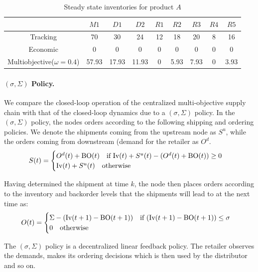 \begin{table}[h]
\caption{Steady state  inventories for product $A$}
\label{tab:esc:steady}
\begin{center}
\begin{tabular}{ccccccccc}\toprule
& $M1$ & $D1$ & $D2$  & $R1$ & $R2$ & $R3$ & $R4$ & $R5$ \\
\midrule
Tracking                      &70   &30   &24   &12&18  &20  &8&16 \\
Economic                      &0    &0    &0    &0 &0   &0   &0&0   \\
Multiobjective($\omega = 0.4$)&57.93&17.93&11.93&0 &5.93&7.93&0&3.93\\
\bottomrule
\end{tabular}
\end{center}
\end{table}

\paragraph{$(\sigma,\Sigma) $ Policy.} We compare the closed-loop operation of
the centralized multi-objective supply chain with that of the
closed-loop dynamics due to a $(\sigma,\Sigma) $ policy. In the $(\sigma,\Sigma) $
policy, the nodes orders according to the
following shipping and ordering policies. We denote the shipments coming from the upstream
node as $S^{u}$, while the orders coming from downstream (demand for
the retailer as $O^{d}$.
\begin{equation}
S(t) = \begin{cases} O^{d}(t)+\textrm{BO}(t) \quad \text{if~}
  \textrm{Iv}(t)+S^{u}(t)-(O^{d}(t)+\textrm{BO}(t)) \geq 0 \\
  \textrm{Iv}(t)+S^{u}(t)\quad \text{otherwise}
  \end{cases}
\end{equation}

Having determined the shipment at time $k$, the node then places
orders according to the inventory and backorder levels that the
shipments will lead to at the next time as:
\begin{equation}
O(t) = \begin{cases} \Sigma - (\textrm{Iv}(t+1)-\textrm{BO}(t+1)) \quad
  \text{if~} (\textrm{Iv}(t+1)-\textrm{BO}(t+1)) \leq \sigma\\
0 \quad \text{otherwise~}
\end{cases}
\end{equation}

The $(\sigma,\Sigma)$ policy is a decentralized linear feedback policy. The retailer
observes the demands, makes its ordering decisions which is then used
by the distributor and so on. 

